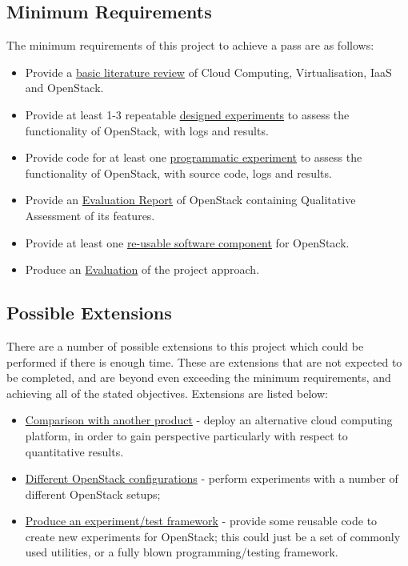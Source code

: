 \subsection{Minimum Requirements}

The minimum requirements of this project to achieve a pass are as follows:
\begin{itemize}
\itemsep0em

\item Provide a \underline{basic literature review} of Cloud Computing, Virtualisation, IaaS and OpenStack. 
\item Provide at least 1-3 repeatable \underline{designed experiments} to assess the functionality of OpenStack, with logs and results. 
\item Provide code for at least one \underline{programmatic experiment} to assess the functionality of OpenStack, with source code, logs and results. 
\item Provide an \underline{Evaluation Report} of OpenStack containing Qualitative Assessment of its features. 
\item Provide at least one \underline{re-usable software component} for OpenStack. 
\item Produce an \underline{Evaluation} of the project approach. 

\end{itemize}

\subsection{Possible Extensions}

There are a number of possible extensions to this project which could be performed if there is enough time. These are extensions that are not expected to be completed, and are beyond even exceeding the minimum requirements, and achieving all of the stated objectives. Extensions are listed below:
\begin{itemize}
\itemsep0em
\item \underline{Comparison with another product} - deploy an alternative cloud computing platform, in order to gain perspective particularly with respect to quantitative results. 
\item \underline{Different OpenStack configurations} - perform experiments with a number of different OpenStack setups; 
\item \underline{Produce an experiment/test framework} - provide some reusable code to create new experiments for OpenStack; this could just be a set of commonly used utilities, or a fully blown programming/testing framework. 
\end{itemize}


